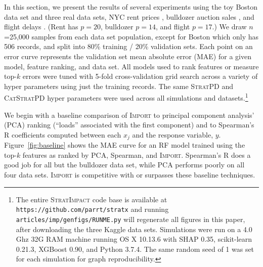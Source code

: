 \documentclass[11pt]{article}
\newcommand{\figref}[1]{Figure~\ref{#1}}
\newcommand{\cut}[1]{}
\newcommand{\Impo}{\fontfamily{cmr}\textsc{Import}}
\newcommand{\simp}{\fontfamily{cmr}\textsc{\small StratImpact}}
\newcommand{\spd}{\fontfamily{cmr}\textsc{\small StratPD}}
\newcommand{\cspd}{\fontfamily{cmr}\textsc{\small CatStratPD}}
\begin{document}
In this section, we present the results of several experiments using the toy Boston data set and three real data sets, NYC rent prices \citep{rent}, bulldozer auction sales \citep{bulldozer}, and flight delays \citep{flights}. (Rent has $p=20$, bulldozer $p=14$, and flight $p=17$.) We draw $n$=25,000 samples from each data set population, except for Boston which only has 506 records, and split into 80\% training / 20\% validation sets. Each point on an error curve represents the validation set mean absolute error (MAE) for a given model, feature ranking, and data set. All models used to rank features or measure top-$k$ errors were tuned with 5-fold cross-validation grid search across a variety of hyper parameters using just the training records. The same \spd{} and \cspd{} hyper parameters were used across all simulations and datasets.\footnote{
The entire \simp{} code base is available at {\tt\small https://github.com/parrt/stratx} and running {\tt\small articles/imp/genfigs/RUNME.py} will regenerate all figures in this paper, after downloading the three Kaggle data sets.  Simulations were run on a 4.0 Ghz 32G RAM machine running OS X 10.13.6 with SHAP 0.35, scikit-learn 0.21.3, XGBoost 0.90, and Python 3.7.4. The same random seed of 1 was set for each simulation for graph reproducibility.}

We begin with a baseline comparison of \Impo{} to principal component analysis' (PCA) ranking (``loads'' associated with the first component) and to Spearman's R coefficients computed between each $x_j$ and the response variable, $y$.  \figref{fig:baseline} shows the MAE curve for an RF model trained using the top-$k$ features as ranked by PCA, Spearman, and \Impo. Spearman's R does a good job for all but the bulldozer data set, while PCA performs poorly on all four data sets. \Impo{} is competitive with or surpasses these baseline techniques. 

\cut{
\figref{fig:baseline} also shows the error curve for the features ranked by ordinary least squares (OLS); a feature's score is its $\beta$ coefficient divided by its standard error. (OLS is not applicable to the bulldozer data set because it has many high-cardinality categorical explanatory variables, which would create tens of thousands of dummy variables.) 

OLS curves are similar to \Impo's except for rent in \figref{fig:baseline}d and are included as a common reference curve on subsequent graphs.
}
\end{document}
